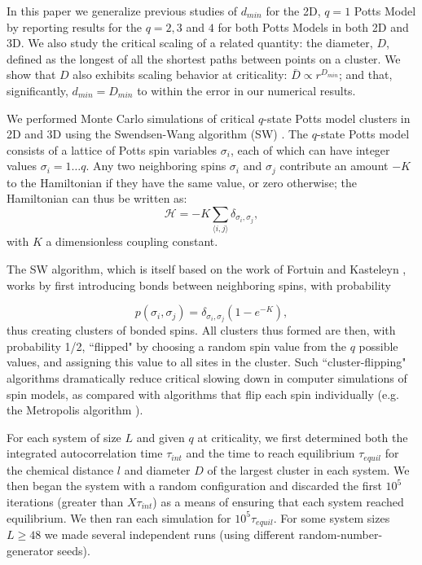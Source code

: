 \documentclass[aps, preprint, groupedaddress]{revtex4-1}
\newcommand{\lb}{{\langle}}
\newcommand{\rb}{{\rangle}}
\begin{document}
In this paper we generalize previous studies of $d_{min}$ for the 2D, $q=1$ Potts Model by reporting results for the $q = 2, 3$ and $4$ for both Potts Models in both 2D and 3D.  We also study the critical scaling of a related quantity: the diameter, $D$, defined as the longest of all the shortest paths between points on a cluster.
We show that $D$ also exhibits scaling behavior at criticality: $\bar{D} \propto r^{D_{min}}$; and that, significantly, $d_{min} = D_{min}$ to within the error in our numerical results. 


We performed Monte Carlo simulations of critical $q$-state Potts model clusters in 2D and 3D using the Swendsen-Wang algorithm (SW) \cite{SwWa86, NeBa99}.  The $q$-state Potts model consists of a lattice of Potts spin variables $\sigma_i$, each of which can have integer values $\sigma_i = 1 \dots q$.  Any two neighboring spins $\sigma_i$ and $\sigma_j$ contribute an amount $-K$ to the Hamiltonian if they have the same value, or zero otherwise; the Hamiltonian can thus be written as:
\begin{equation}
\mathcal{H} = -K \sum_{\lb i,j \rb} \delta_{\sigma_i, \sigma_j},
\end{equation}     
with $K$ a dimensionless coupling constant.  

The SW algorithm, which is itself based on the work of Fortuin and Kasteleyn \cite{FoKa}, works by first introducing bonds between neighboring spins, with probability 

\begin{equation}
p(\sigma_i,\sigma_j) = \delta_{\sigma_i, \sigma_j} (1-e^{-K}),
\end{equation}  
thus creating clusters of bonded spins.   All clusters thus formed are then, with probability 1/2, ``flipped" by choosing a random spin value from the $q$ possible values, and assigning this value to all sites in the cluster.  Such ``cluster-flipping" algorithms dramatically reduce critical slowing down in computer simulations of spin models, as compared with algorithms that flip each spin individually \cite{NeBa99} (e.g. the Metropolis algorithm \cite{Met}). 

For each system of size $L$ and given $q$ at criticality, we first determined both the integrated autocorrelation time $\tau_{int}$ and the time to reach equilibrium $\tau_{equil}$ for the chemical distance $l$ and diameter $D$ of the largest cluster in each system. We then began the system with a random configuration and discarded the first $10^5$ iterations (greater than $X \tau_{int}$) as a means of ensuring that each system reached equilibrium.  We then ran each simulation for $10^5 \tau_{equil}$.  For some system sizes $L \ge 48$ we made several independent runs (using different random-number-generator seeds).  
\end{document}
